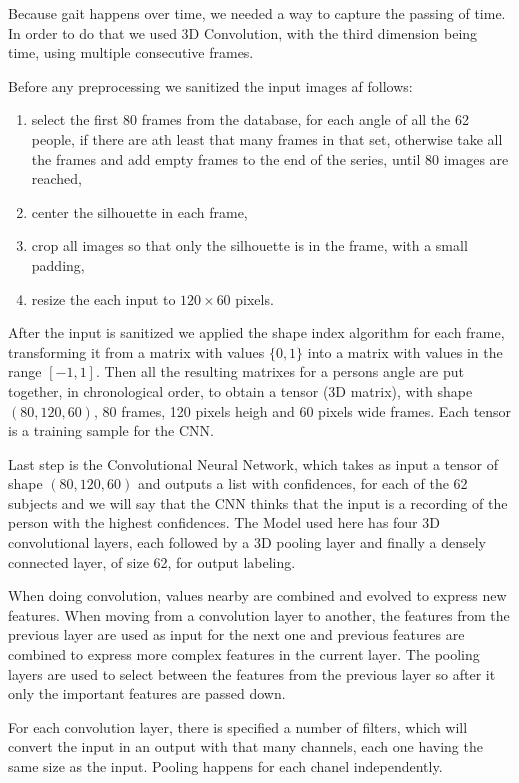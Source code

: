 \documentclass[12pt]{article}
\theoremstyle{definition}
\begin{document}
	Because gait happens over time, we needed a way to capture the passing of time. In order to do that we used 3D Convolution, with the third dimension being time, using multiple consecutive frames.

	Before any preprocessing we sanitized the input images af follows:
	\begin{enumerate}
		\item select the first 80 frames from the database, for each angle of all the 62 people, if there are ath least that many frames in that set, otherwise take all the frames and add empty frames to the end of the series, until 80 images are reached,
		\item center the silhouette in each frame,
		\item crop all images so that only the silhouette is in the frame, with a small padding,
		\item resize the each input to $120 \times 60$ pixels.
	\end{enumerate}

	After the input is sanitized we applied the shape index algorithm for each frame, transforming it from a matrix with values $\{0, 1\}$ into a matrix with values in the range $[-1, 1]$. Then all the resulting matrixes for a persons angle are put together, in chronological order, to obtain a tensor (3D matrix), with shape $(80, 120, 60)$, 80 frames, 120 pixels heigh and 60 pixels wide frames. Each tensor is a training sample for the CNN.

	Last step is the Convolutional Neural Network, which takes as input a tensor of shape $(80, 120, 60)$ and outputs a list with confidences, for each of the 62 subjects and we will say that the CNN thinks that the input is a recording of the person with the highest confidences.
	The Model used here has four 3D convolutional layers, each followed by a 3D pooling layer and finally a densely connected layer, of size 62, for output labeling.

	When doing convolution, values nearby are combined and evolved to express new features. When moving from a convolution layer to another, the features from the previous layer are used as input for the next one and previous features are combined to express more complex features in the current layer. The pooling layers are used to select between the features from the previous layer so after it only the important features are passed down.

	For each convolution layer, there is specified a number of filters, which will convert the input in an output with that many channels, each one having the same size as the input. Pooling happens for each chanel independently.
\end{document}
